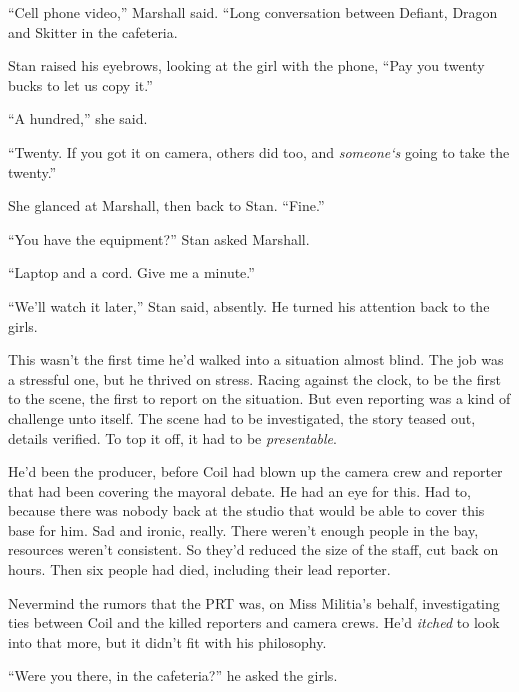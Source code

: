 ``Cell phone video,'' Marshall said.  ``Long conversation between Defiant, Dragon and Skitter in the cafeteria.



Stan raised his eyebrows, looking at the girl with the phone, ``Pay you twenty bucks to let us copy it.''



``A hundred,'' she said.



``Twenty.  If you got it on camera, others did too, and \emph{someone}\emph{`s} going to take the twenty.''



She glanced at Marshall, then back to Stan.  ``Fine.''



``You have the equipment?'' Stan asked Marshall.



``Laptop and a cord.  Give me a minute.''



``We'll watch it later,'' Stan said, absently.  He turned his attention back to the girls.



This wasn't the first time he'd walked into a situation almost blind.  The job was a stressful one, but he thrived on stress.  Racing against the clock, to be the first to the scene, the first to report on the situation.  But even reporting was a kind of challenge unto itself.  The scene had to be investigated, the story teased out, details verified.  To top it off, it had to be \emph{presentable}.



He'd been the producer, before Coil had blown up the camera crew and reporter that had been covering the mayoral debate.  He had an eye for this.  Had to, because there was nobody back at the studio that would be able to cover this base for him.  Sad and ironic, really.  There weren't enough people in the bay, resources weren't consistent.  So they'd reduced the size of the staff, cut back on hours.  Then six people had died, including their lead reporter.



Nevermind the rumors that the PRT was, on Miss Militia's behalf, investigating ties between Coil and the killed reporters and camera crews.  He'd \emph{itched} to look into that more, but it didn't fit with his philosophy.



``Were you there, in the cafeteria?'' he asked the girls.



